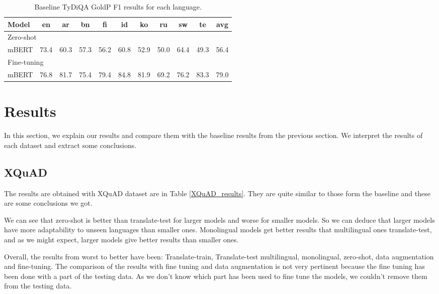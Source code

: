 \documentclass[11pt]{article}
\begin{document}
\begin{table}[!ht]
    \centering
    \begin{adjustbox}{max width=\columnwidth}
    \begin{tabular}{l|ccccccccc|c}
        \toprule
        Model & en & ar & bn & fi & id & ko & ru & sw & te & avg \\
        \midrule
        \multicolumn{11}{l}{Zero-shot} \\
        \midrule
        mBERT & 73.4 & 60.3 & 57.3 & 56.2 & 60.8 & 52.9 & 50.0 & 64.4 & 49.3 & 56.4  \\ \midrule
        \multicolumn{11}{l}{Fine-tuning} \\
        \midrule
        mBERT & 76.8 & 81.7 & 75.4 & 79.4 & 84.8 & 81.9 & 69.2 & 76.2 & 83.3 & 79.0  \\
        \bottomrule
    \end{tabular}
    \end{adjustbox}
    \centering
    \caption{Baseline TyDiQA GoldP F1 results for each language.}
    \label{TyDiQA_baseline_results}
\end{table}

\section{Results}

In this section, we explain our results and compare them with the baseline results from the previous section. We interpret the results of each dataset and extract some conclusions.

\subsection{XQuAD}
\label{sec:XQuAD_res}

The results are obtained with XQuAD dataset are in Table \ref{XQuAD_results}. They are quite similar to those form the baseline and these are some conclusions we got.

We can see that zero-shot is better than translate-test for larger models and worse for smaller models. So we can deduce that larger models have more adaptability to unseen languages than smaller ones. Monolingual models get better results that multilingual ones translate-test, and as we might expect, larger models give better results than smaller ones.

Overall, the results from worst to better have been: Translate-train, Translate-test multilingual, monolingual, zero-shot, data augmentation and fine-tuning. The comparison of the results with fine tuning and data augmentation is not very pertinent because the fine tuning has been done with a part of the testing data. As we don't know which part has been used to fine tune the models, we couldn't remove them from the testing data.
\end{document}
